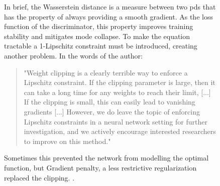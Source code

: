 
\begin{figure}
    \footnotesize
\noindent
{}
\begin{tcolorbox}[arc=0.5mm, 
    colback=MidnightBlue!10!white, 
    coltext=MidnightBlue!90!black,  
    colframe=MidnightBlue!90!black,
    colbacktitle=MidnightBlue!80,
    leftrule=0mm,
    rightrule=0mm, 
    toprule=0mm, 
    bottomrule=0mm,
    box align=top,
    title={\begin{panel}Wasserstein's distance \label{pan:wasserstein}\end{panel}}]

In brief, the Wasserstein distance is a measure between two \glspl{pd} that has the property of always providing a smooth gradient. As the loss function of the discriminator, this property improves training stability and mitigates mode collapse. To make the equation tractable a 1-Lipschitz constraint must be introduced, creating another problem. In the words of the author: \begin{quote}
    "Weight clipping is a clearly terrible way to enforce a Lipschitz constraint. If the clipping parameter is large, then it can take a long time for any weights to reach their limit, [...] If the clipping is small, this can easily lead to vanishing gradients [...] However, we do leave the topic of enforcing Lipschitz constraints in a neural network setting for further investigation, and we actively encourage interested researchers to improve on this method." \cite{arjovsky2017wasserstein}
\end{quote} 
Sometimes this prevented the network from modelling the optimal function, but Gradient penalty, a less restrictive regularization replaced the clipping. \cite{Petzka2018}.

\end{tcolorbox}
\normalsize

\end{figure}

